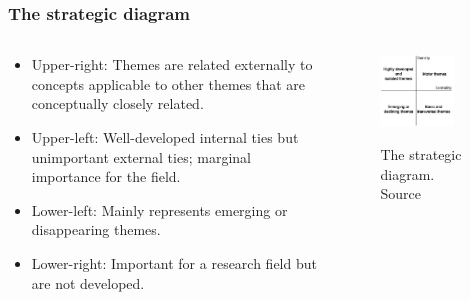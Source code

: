 \documentclass[aspectratio=169]{beamer}
\begin{document}
\begin{frame}
	\frametitle{The strategic diagram}
	\begin{columns}
		\begin{column}{0.5\textwidth}
			\begin{itemize}
				\item Upper-right: Themes are related externally to concepts applicable
				      to other themes that are conceptually closely related.
				\item Upper-left: Well-developed internal ties but unimportant external
				      ties; marginal importance for the field.
				\item Lower-left: Mainly represents emerging or disappearing themes.
				\item Lower-right: Important for a research field but are not
				      developed.
			\end{itemize}
		\end{column}
		\begin{column}{0.5\textwidth}
			\begin{figure}
				\centering
				\includegraphics[width=0.8\textwidth]
				{./img/strategic_diagram_cobo2011.png}
				\label{fig:strategic_diagram}
				\caption{The strategic diagram. Source~\cite{cobo2011}}
			\end{figure}
		\end{column}
	\end{columns}
\end{frame}
\end{document}

